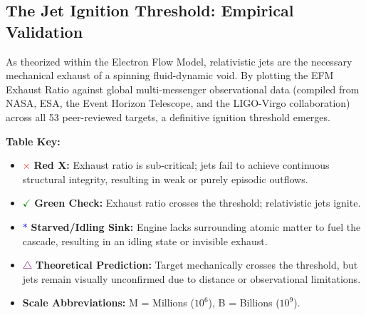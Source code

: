 \documentclass[11pt, a4paper]{article}
\begin{document}
\clearpage
\begin{landscape}
\section{The Jet Ignition Threshold: Empirical Validation}

As theorized within the Electron Flow Model, relativistic jets are the necessary mechanical exhaust of a spinning fluid-dynamic void. By plotting the EFM Exhaust Ratio against global multi-messenger observational data (compiled from NASA, ESA, the Event Horizon Telescope, and the LIGO-Virgo collaboration) across all 53 peer-reviewed targets, a definitive ignition threshold emerges. 

\vspace{1em}
\noindent \textbf{Table Key:}
\begin{itemize}
  \item \textcolor{red}{\Large $\times$} \textbf{Red X:} Exhaust ratio is sub-critical; jets fail to achieve continuous structural integrity, resulting in weak or purely episodic outflows.
  \item \textcolor{green}{\Large $\checkmark$} \textbf{Green Check:} Exhaust ratio crosses the threshold; relativistic jets ignite.
  \item \textcolor{blue}{\Large $*$} \textbf{Starved/Idling Sink:} Engine lacks surrounding atomic matter to fuel the cascade, resulting in an idling state or invisible exhaust.
  \item \textcolor{purple}{\Large $\triangle$} \textbf{Theoretical Prediction:} Target mechanically crosses the threshold, but jets remain visually unconfirmed due to distance or observational limitations.
  \item \textbf{Scale Abbreviations:} M = Millions ($10^6$), B = Billions ($10^9$).
\end{itemize}
\vspace{1em}


\end{landscape}
\end{document}
